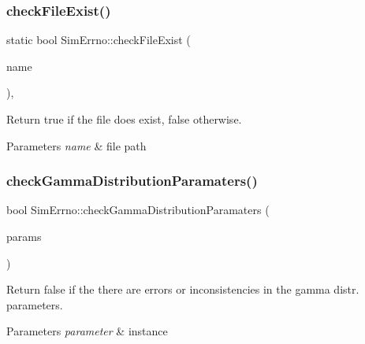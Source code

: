 \subsubsection{\texorpdfstring{check\+File\+Exist()}{checkFileExist()}}
{\footnotesize\ttfamily static bool Sim\+Errno\+::check\+File\+Exist (\begin{DoxyParamCaption}\item[{const std\+::string}]{name }\end{DoxyParamCaption})\hspace{0.3cm}{\ttfamily [inline]}, {\ttfamily [static]}}



Return true if the file does exist, false otherwise. 


\begin{DoxyParams}{Parameters}
{\em name} & file path \\
\hline
\end{DoxyParams}
\mbox{\label{class_sim_errno_aa997e9bec44280eec04ce320f8d75031}} 
\subsubsection{\texorpdfstring{check\+Gamma\+Distribution\+Paramaters()}{checkGammaDistributionParamaters()}}
{\footnotesize\ttfamily bool Sim\+Errno\+::check\+Gamma\+Distribution\+Paramaters (\begin{DoxyParamCaption}\item[{\hyperlink{class_parameters}{Parameters} \&}]{params }\end{DoxyParamCaption})\hspace{0.3cm}{\ttfamily [static]}}



Return false if the there are errors or inconsistencies in the gamma distr. parameters. 


\begin{DoxyParams}{Parameters}
{\em parameter} & instance \\
\hline
\end{DoxyParams}
\mbox{\label{class_sim_errno_a21ed929e9b81e9059d4da3ca03c9d80c}} 
